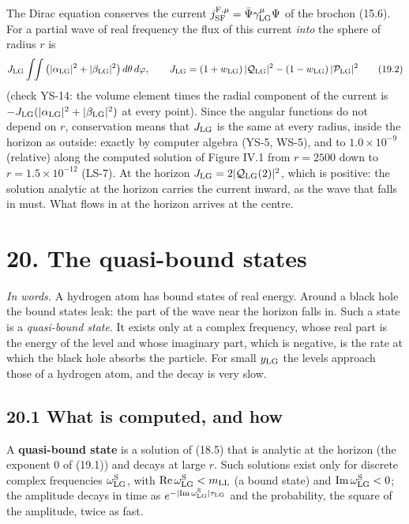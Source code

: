 \documentclass[
  10pt,
]{article}
\begin{document}
The Dirac equation conserves the current
\(j^{{\rm F},\mu}_{\rm SF}=\bar\Psi\gamma^\mu_{\rm LG}\Psi\) of the
brochon (15.6). For a partial wave of real frequency the flux of this
current \emph{into} the sphere of radius \(r\) is
\[J_{\rm LG}\int\!\!\int\big(\lvert\alpha_{\rm LG}\rvert^2+\lvert\beta_{\rm LG}\rvert^2\big)\,d\theta\,d\varphi,\qquad J_{\rm LG}=(1+w_{\rm LG})\,\lvert\mathcal Q_{\rm LG}\rvert^2-(1-w_{\rm LG})\,\lvert\mathcal P_{\rm LG}\rvert^2\tag{19.2}\]
(check YS-14: the volume element times the radial component of the
current is
\(-J_{\rm LG}(\lvert\alpha_{\rm LG}\rvert^2+\lvert\beta_{\rm LG}\rvert^2)\)
at every point). Since the angular functions do not depend on \(r\),
conservation means that \(J_{\rm LG}\) is the same at every radius,
inside the horizon as outside: exactly by computer algebra (YS-5, WS-5),
and to \(1.0\times10^{-9}\) (relative) along the computed solution of
Figure IV.1 from \(r=2500\) down to \(r=1.5\times10^{-12}\) (LS-7). At
the horizon \(J_{\rm LG}=2\lvert\mathcal Q_{\rm LG}(2)\rvert^2\), which
is positive: the solution analytic at the horizon carries the current
inward, as the wave that falls in must. What flows in at the horizon
arrives at the centre.

\hypertarget{the-quasi-bound-states}{%
\section{20. The quasi-bound states}\label{the-quasi-bound-states}}

\emph{In words.} A hydrogen atom has bound states of real energy. Around
a black hole the bound states leak: the part of the wave near the
horizon falls in. Such a state is a \emph{quasi-bound state}. It exists
only at a complex frequency, whose real part is the energy of the level
and whose imaginary part, which is negative, is the rate at which the
black hole absorbs the particle. For small \(y_{\rm LG}\) the levels
approach those of a hydrogen atom, and the decay is very slow.

\hypertarget{what-is-computed-and-how}{%
\subsection{20.1 What is computed, and
how}\label{what-is-computed-and-how}}

A \textbf{quasi-bound state} is a solution of (18.5) that is analytic at
the horizon (the exponent 0 of (19.1)) and decays at large \(r\). Such
solutions exist only for discrete complex frequencies
\(\omega^{\rm S}_{\rm LG}\), with
\({\rm Re}\,\omega^{\rm S}_{\rm LG}<m_{\rm LL}\) (a bound state) and
\({\rm Im}\,\omega^{\rm S}_{\rm LG}<0\); the amplitude decays in time as
\(e^{-\lvert{\rm Im}\,\omega^{\rm S}_{\rm LG}\rvert\tau_{\rm LG}}\) and
the probability, the square of the amplitude, twice as fast.
\end{document}
